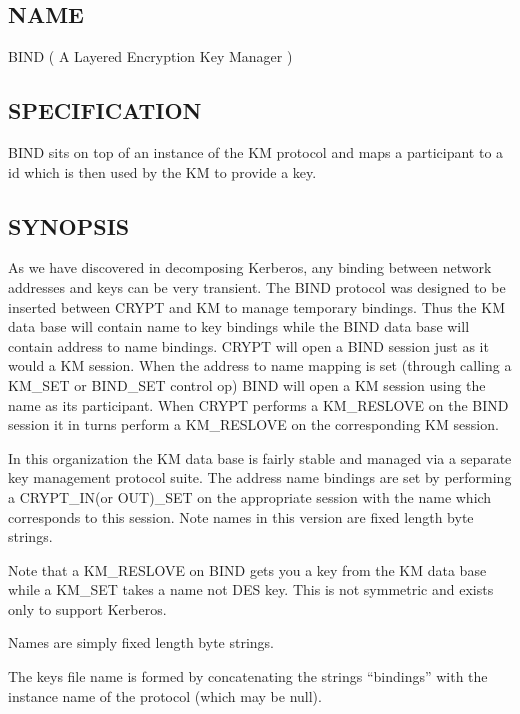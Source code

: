 %
%
%

\subsection*{NAME}
\label{BIND}

\noindent BIND ( A Layered Encryption Key Manager )



\subsection*{SPECIFICATION}

\noindent
BIND sits on top of an instance of the KM protocol and 
maps a participant to a id which is then used by the KM 
to provide a key.  

\subsection*{SYNOPSIS}
As we have discovered in decomposing Kerberos, any binding 
between network addresses and keys can be very transient. The 
BIND protocol was designed to be inserted between CRYPT and 
KM to manage temporary bindings. Thus the KM data base will 
contain name to key bindings while the BIND data base will 
contain address to name bindings. CRYPT will open a BIND 
session just as it would a KM session. When the address to 
name  mapping is set (through calling a KM\_SET or BIND\_SET  
control op) BIND will open a KM session using the name as its 
participant. When CRYPT performs a KM\_RESLOVE on the BIND 
session it in turns perform a KM\_RESLOVE on the 
corresponding KM session. 

In this organization the KM data base is fairly stable and 
managed via a separate key management protocol suite.  The 
address name bindings are set by performing a CRYPT\_IN(or 
OUT)\_SET on the appropriate session with  the name which 
corresponds to this session. Note names in this  version are 
fixed length byte strings. 

Note that a KM\_RESLOVE on BIND gets you a key from the KM 
data base while a KM\_SET takes a name not DES key. This is 
not symmetric and exists only to support Kerberos.

Names are simply fixed length byte strings.

The keys file name is formed by concatenating the strings 
``bindings'' with the instance name of the protocol (which may 
be null).


